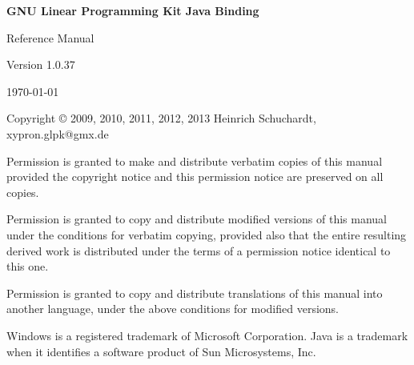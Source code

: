 \documentclass[a4paper,11pt]{report}
\newcommand{\glpkJavaVersion}{1.0.37}
\begin{document}

\thispagestyle{empty}

\begin{center}

\vspace*{1in}

\begin{huge}
\sf\bfseries GNU Linear Programming Kit\linebreak
Java Binding
\end{huge}

\vspace{0.5in}

\begin{LARGE}
\sf Reference Manual
\end{LARGE}

\vspace{0.5in}

\begin{LARGE}
\sf Version \glpkJavaVersion
\end{LARGE}

\vspace{0.5in}
\begin{Large}
\sf \today
\end{Large}
\end{center}

\newpage

\vspace*{1in}

\vfill

\medskip \noindent
Copyright \copyright{} 2009, 2010, 2011, 2012, 2013 Heinrich Schuchardt,
xypron.glpk@gmx.de

\medskip \noindent
Permission is granted to make and distribute verbatim copies of this
manual provided the copyright notice and this permission notice are
preserved on all copies.

\medskip \noindent
Permission is granted to copy and distribute modified versions of this
manual under the conditions for verbatim copying, provided also that the
entire resulting derived work is distributed under the terms of
a permission notice identical to this one.

\medskip \noindent
Permission is granted to copy and distribute translations of this manual
into another language, under the above conditions for modified versions.

\medskip \noindent
Windows is a registered trademark of Microsoft Corporation. Java is a 
trademark when it identifies a software product of Sun Microsystems, Inc.
\end{document}
